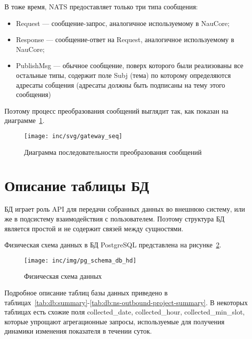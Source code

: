 В тоже время, NATS предоставляет только три типа сообщения:
\begin{itemize}
    \item Request --- сообщение-запрос, аналогичное используемому в NauCore;
    \item Response --- сообщение-ответ на Request, аналогичное используемому в NauCore;
    \item PublishMsg --- обычное сообщение, поверх которого были реализованы все остальные типы,
    содержит поле Subj (тема) по которому определяются адресаты собщения (адресаты должны быть подписаны на тему этого сообщения)
\end{itemize}

Поэтому процесс преобразования сообщений выглядит так, как показан на диаграмме~\ref{pic:gateway:seq}.

\begin{figure}[!ht]
    \centering
    \texttt{[image: inc/svg/gateway\_seq]}
    \caption{Диаграмма последовательности преобразования сообщений}
    \label{pic:gateway:seq}
\end{figure}


\section{Описание таблицы БД}\label{sec:описание-таблицы-бд}

БД играет роль API для передачи собранных данных во внешнюю систему,
или же в подсистему взаимодействия с пользователем.
Поэтому структура БД является простой и не содержит связей между сущностями.

Физическая схема данных в БД PostgreSQL представлена на рисунке~\ref{pic:schema-db}.

\begin{figure}[!ht]
    \centering
    \texttt{[image: inc/img/pg\_schema\_db\_hd]}
    \caption{Физическая схема данных}
    \label{pic:schema-db}
\end{figure}

Подробное описание таблиц базы данных приведено в таблицах~\ref{tab:db:summary}-\ref{tab:db:ns-outbound-project-summary}.
В некоторых таблицах есть схожие поля collected\_date, collected\_hour, collected\_min\_slot,
которые упрощают агрегационные запросы, используемые для получения динамики изменения показателя в течении суток.

